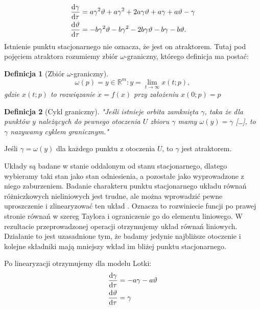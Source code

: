 \documentclass[10pt, a4paper, twoside, onecolumn]{article}
\numberwithin{equation}{section}
\newtheorem*{definition}{Definicja}
\begin{document}
	\begin{equation}\label{bruskelator_0}
	\begin{split}
		\dv{\gamma}{\tau} &= a\gamma^{2}\vartheta+a\gamma^{2}+2a\gamma\vartheta+a\gamma+a\vartheta-\gamma \\
		\dv{\vartheta}{\tau} &= -b\gamma^{2}\vartheta-b\gamma^{2}-2b\gamma\vartheta-b\gamma-b\vartheta.
	\end{split}
	\end{equation}
	Istnienie punktu stacjonarnego nie oznacza, że jest on atraktorem. Tutaj pod pojęciem atraktora rozumiemy zbiór \(\omega\)-graniczny, którego definicja ma postać:
	\begin{definition}[Zbiór $\omega$-graniczny]
	\begin{equation*}
		\omega(p) = {y\in\mathbb{R}^{m}: y = \lim_{t\to\infty}}x(t; p),
	\end{equation*}
	gdzie \(x(t; p)\) to rozwiązanie \(\dot{x}=f(x)\) przy założeniu \(x(0; p) = p\)
	\end{definition}
	\begin{definition}[Cykl graniczny]
		"Jeśli istnieje orbita zamknięta $\gamma$, taka że dla punktów $y$ należących do pewnego otoczenia $U$ zbioru $\gamma$ mamy \(\omega(y)=\gamma\) [\ldots], to $\gamma$ nazywamy \emph{cyklem granicznym}."
	\end{definition}\noindent
	Jeśli \(\gamma=\omega(y)\) dla każdego punktu z otoczenia $U$, to $\gamma$ jest atraktorem. \cite{palczewski} \par
	Układy są badane w stanie oddalonym od stanu stacjonarnego, dlatego wybieramy taki stan jako stan odniesienia, a pozostałe jako wyprowadzone z niego zaburzeniem.
	Badanie charakteru punktu stacjonarnego układu równań różniczkowych nieliniowych jest trudne, ale można wprowadzić pewne uproszczenie i zlinearyzować ten układ \cite{kawczynski, palczewski}. Oznacza to rozwiniecie funcji po prawej stronie równań w szereg Taylora i ograniczenie go do elementu liniowego. W rezultacie przeprowadzonej operacji otrzymujemy układ równań liniowych. Działanie to jest uzasadnione tym, że badamy jedynie najbliższe otoczenie i kolejne składniki mają mniejszy wkład im bliżej punktu stacjonarnego. \par
	Po linearyzacji otrzymujemy dla modelu Lotki:
	\begin{equation}\label{lotka_lin}
	\begin{split}
		\dv{\gamma}{\tau} &= -a\gamma-a\vartheta \\
		\dv{\vartheta}{\tau} &= \gamma
	\end{split}
	\end{equation}
\end{document}

